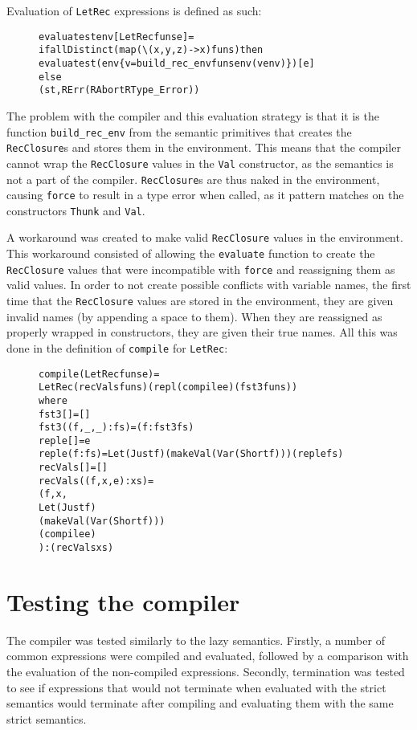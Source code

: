 Evaluation of \texttt{LetRec} expressions is defined as such:

\begin{figure}[H]
\begin{alltt}
  evaluate st env [LetRec funs e] =
    if allDistinct (map (\textbackslash(x,y,z) -> x) funs) then
      evaluate st (env \{v = build_rec_env funs env (v env)\}) [e]
    else
      (st, RErr (RAbort RType_Error))
\end{alltt}
\end{figure}

\noindent The problem with the compiler and this evaluation strategy is that it
is the function \texttt{build\_rec\_env} from the semantic primitives that
creates the \texttt{RecClosure}s and stores them in the environment. This means
that the compiler cannot wrap the \texttt{RecClosure} values in the
\texttt{Val} constructor, as the semantics is not a part of the compiler.
\texttt{RecClosure}s are thus naked in the environment, causing \texttt{force}
to result in a type error when called, as it pattern matches on the constructors
\texttt{Thunk} and \texttt{Val}.

A workaround was created to
make valid \texttt{RecClosure} values in the environment. This workaround
consisted of allowing the \texttt{evaluate} function to create the
\texttt{RecClosure} values that were incompatible with \texttt{force} and
reassigning them as valid values. In order to not create possible conflicts
with variable names, the first time that the \texttt{RecClosure} values are
stored in the environment, they are given invalid names (by appending a space
to them). When they are reassigned as properly wrapped in constructors, they
are given their true names. All this was done in the definition of
\texttt{compile} for \texttt{LetRec}:

\begin{figure}[H]
\begin{alltt}
  compile (LetRec funs e) =
    LetRec (recVals funs) (repl (compile e) (fst3 funs))
    where
      fst3 []           = []
      fst3 ((f,_,_):fs) = (f:fst3 fs)
      repl e []     = e
      repl e (f:fs) = Let (Just f) (makeVal (Var (Short f))) (repl e fs)
      recVals []           = []
      recVals ((f,x,e):xs) =
        (f,x,
         Let (Just f)
         (makeVal (Var (Short f)))
         (compile e)
        ):(recVals xs)
\end{alltt}
\end{figure}

\section{Testing the compiler}
\label{compiler:test}
The compiler was tested similarly to the lazy semantics. Firstly, a number of
common expressions were compiled and evaluated, followed by a comparison with
the evaluation of the non-compiled expressions. Secondly, termination was tested
to see if expressions that would not terminate when evaluated with the strict
semantics would terminate after compiling and evaluating them with the same
strict semantics.


